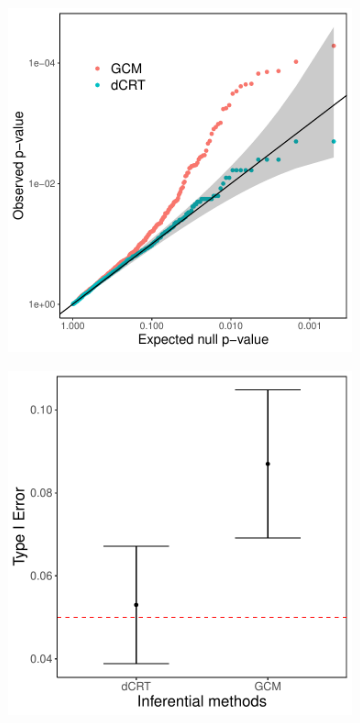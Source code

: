 \documentclass[aos]{imsart}
\theoremstyle{plain}
\theoremstyle{remark}
\begin{document}
	\begin{figure}
		\begin{subfigure}[b]{0.49\textwidth}
			\centering
			\includegraphics[width=\linewidth]{Figures/qq-plots.pdf} \\
		\end{subfigure}%
		\begin{subfigure}[b]{0.49\textwidth}
			\centering
			\includegraphics[width=\linewidth]{Figures/type_I_err_5e-2.pdf} \\ 
		\end{subfigure}
	

\end{figure}
\end{document}

